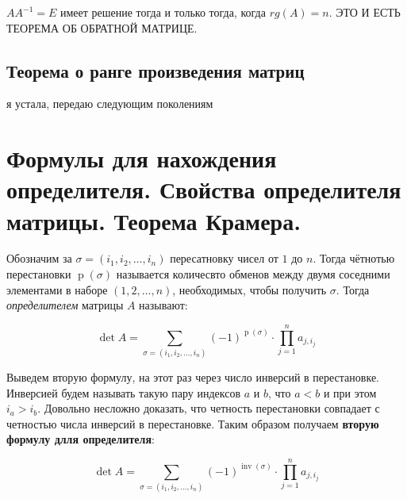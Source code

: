 \documentclass{article}
\begin{document}
$AA^{-1} = E$ имеет решение тогда и только тогда, когда $rg(A) = n$. ЭТО И ЕСТЬ ТЕОРЕМА ОБ ОБРАТНОЙ МАТРИЦЕ.

\subsection{Теорема о ранге произведения матриц}
я устала, передаю следующим поколениям

\newpage
\section{Формулы для нахождения определителя. Свойства определителя матрицы. Теорема Крамера.}

Обозначим за $\sigma = (i_1, i_2, \ldots, i_n)$ пересатновку чисел от $1$ до $n$. Тогда чётнотью перестановки $\operatorname{p}(\sigma)$ называется количесвто обменов между двумя соседними элементами в наборе $(1, 2, \ldots, n)$, необходимых, чтобы получить $\sigma$. Тогда \textit{определителем} матрицы $A$ называют:

$$\operatorname{det}A = \sum_{\sigma = (i_1, i_2, \ldots, i_n)} (-1)^{\operatorname{p}(\sigma)} \cdot \prod_{j = 1}^{n}a_{j, i_j}$$

Выведем вторую формулу, на этот раз через число инверсий в перестановке. Инверсией будем называть такую пару индексов $a$ и $b$, что $a < b$ и при этом $i_a > i_b$. Довольно несложно доказать, что четность перестановки совпадает с четностью числа инверсий в перестановке. Таким образом получаем \textbf{вторую формулу длля определителя}:
 
$$\operatorname{det}A = \sum_{\sigma = (i_1, i_2, \ldots, i_n)} (-1)^{\operatorname{inv}(\sigma)} \cdot \prod_{j = 1}^{n}a_{j, i_j}$$
\end{document}
